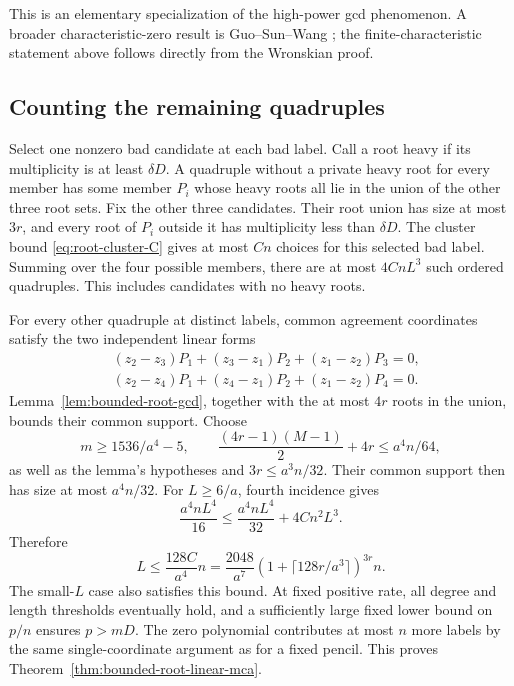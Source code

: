 This is an elementary specialization of the high-power gcd phenomenon.
A broader characteristic-zero result is Guo--Sun--Wang
\cite[Theorem 11]{guo-sun-wang-gcd}; the finite-characteristic statement
above follows directly from the Wronskian proof.

\subsection{Counting the remaining quadruples}

Select one nonzero bad candidate at each bad label. Call a root heavy
if its multiplicity is at least $\delta D$. A quadruple without a
private heavy root for every member has some member $P_i$ whose heavy
roots all lie in the union of the other three root sets. Fix the other
three candidates. Their root union has size at most $3r$, and every
root of $P_i$ outside it has multiplicity less than $\delta D$.
The cluster bound \eqref{eq:root-cluster-C} gives at most $Cn$ choices
for this selected bad label. Summing over the four possible members,
there are at most $4CnL^3$ such ordered quadruples. This includes
candidates with no heavy roots.

For every other quadruple at distinct labels, common agreement
coordinates satisfy the two independent linear forms
\begin{align*}
 &(z_2-z_3)P_1+(z_3-z_1)P_2+(z_1-z_2)P_3=0,\\
 &(z_2-z_4)P_1+(z_4-z_1)P_2+(z_1-z_2)P_4=0.
\end{align*}
Lemma~\ref{lem:bounded-root-gcd}, together with the at most $4r$
roots in the union, bounds their common support. Choose
\[
 m\ge1536/a^4-5,\qquad
 \frac{(4r-1)(M-1)}2+4r\le a^4n/64,
\]
as well as the lemma's hypotheses and $3r\le a^3n/32$.
Their common support then has size at most $a^4n/32$.
For $L\ge6/a$, fourth incidence gives
\[
 \frac{a^4nL^4}{16}
 \le\frac{a^4nL^4}{32}+4Cn^2L^3.
\]
Therefore
\begin{equation}\label{eq:bounded-root-labels}
 L\le\frac{128C}{a^4}n
   =\frac{2048}{a^7}(1+\lceil128r/a^3\rceil)^{3r}n.
\end{equation}
The small-$L$ case also satisfies this bound. At fixed positive rate,
all degree and length thresholds eventually hold, and a sufficiently
large fixed lower bound on $p/n$ ensures $p>mD$.
The zero polynomial contributes at most $n$ more labels by the same
single-coordinate argument as for a fixed pencil. This proves
Theorem~\ref{thm:bounded-root-linear-mca}.

